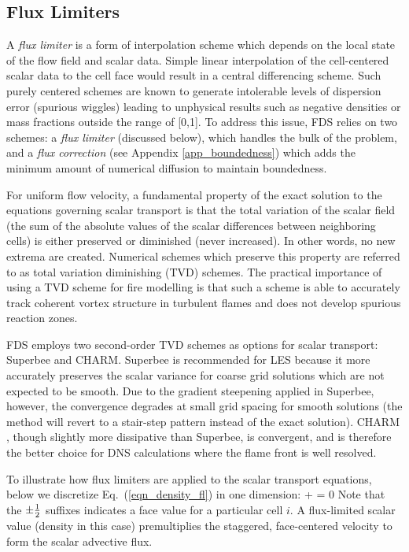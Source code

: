\subsection{Flux Limiters}
\label{sec_flux_limiters}

A \emph{flux limiter} is a form of interpolation scheme which depends on the local state of the flow field and scalar data. Simple linear interpolation of the cell-centered scalar data to the cell face would result in a central differencing scheme.  Such purely centered schemes are known to generate intolerable levels of dispersion error (spurious wiggles) leading to unphysical results such as negative densities or mass fractions outside the range of [0,1].  To address this issue, FDS relies on two schemes: a \emph{flux limiter} (discussed below), which handles the bulk of the problem, and a \emph{flux correction} (see Appendix \ref{app_boundedness}) which adds the minimum amount of numerical diffusion to maintain boundedness.

For uniform flow velocity, a fundamental property of the exact solution to the equations governing scalar transport is that the total variation of the scalar field (the sum of the absolute values of the scalar differences between neighboring cells) is either preserved or diminished (never increased).  In other words, no new extrema are created.  Numerical schemes which preserve this property are referred to as total variation diminishing (TVD) schemes.  The practical importance of using a TVD scheme for fire modelling is that such a scheme is able to accurately track coherent vortex structure in turbulent flames and does not develop spurious reaction zones.

FDS employs two second-order TVD schemes as options for scalar transport: Superbee and CHARM.  Superbee \cite{Roe:1986} is recommended for LES because it more accurately preserves the scalar variance for coarse grid solutions which are not expected to be smooth.  Due to the gradient steepening applied in Superbee, however, the convergence degrades at small grid spacing for smooth solutions (the method will revert to a stair-step pattern instead of the exact solution).  CHARM \cite{Zhou:1995}, though slightly more dissipative than Superbee, is convergent, and is therefore the better choice for DNS calculations where the flame front is well resolved.

To illustrate how flux limiters are applied to the scalar transport equations, below we discretize Eq.~(\ref{eqn_density_fl}) in one dimension:
\be  {}
    +  = 0
\ee
Note that the $\pm\frac{1}{2}$ suffixes indicates a face value for a particular cell $i$. A flux-limited scalar value (density in this case) premultiplies the staggered, face-centered velocity to form the scalar advective flux.

